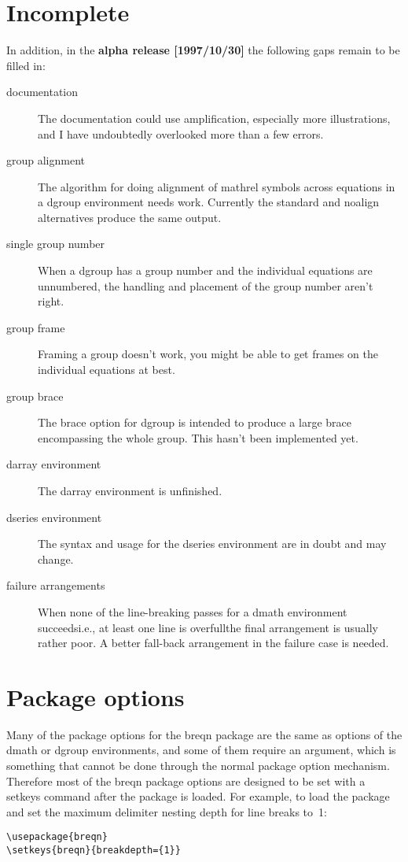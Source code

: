 \documentclass{article}
\newcommand{\ntt}{\normalfont\ttfamily}
\DeclareRobustCommand{\cs}[1]{{\ntt\ttbackslash#1}}
\let\cn=\cs
\DeclareRobustCommand{\pkg}[1]{{\ntt#1}}
\let\opt=\pkg \let\env=\pkg \let\fn=\pkg
\newcommand\dash{\textemdash}
\newcommand\thepkg[1]{the \pkg{breqn} package}
\begin{document}
\section{Incomplete}
In addition, in the \textbf{alpha release [1997/10/30]} the following
gaps remain to be filled in:
\begin{description}
\item[documentation]
The documentation could use amplification, especially more
illustrations, and I have undoubtedly overlooked more than a few errors.

\item[group alignment] The algorithm for doing alignment
of mathrel symbols across equations in a \env{dgroup} environment 
needs work. Currently the standard and \opt{noalign} alternatives
produce the same output.

\item[single group number] When a \env{dgroup} has a group number and
the individual equations are unnumbered, the handling and placement of
the group number aren't right.

\item[group frame] Framing a group doesn't work, you might be able to
get frames on the individual equations at best.

\item[group brace] The \opt{brace} option for \env{dgroup} is intended
to produce a large brace encompassing the whole group. This hasn't been
implemented yet.

\item[darray environment] The \env{darray} environment is unfinished.

\item[dseries environment] The syntax and usage for the \env{dseries}
environment are in doubt and may change.

\item[failure arrangements] When none of the line-breaking passes for a
\env{dmath} environment succeeds\dash i.e., at least one line is
overfull\dash the final arrangement is usually rather poor. A better
fall-back arrangement in the failure case is needed.

\end{description}

\section{Package options}

Many of the package options for \thepkg/ are the same as options of the
\env{dmath} or \env{dgroup} environments, and some of them require an
argument, which is something that cannot be done through the normal
package option mechanism. Therefore most of the \pkg{breqn} package
options are designed to be set with a \cn{setkeys} command after the
package is loaded. For example, to load the package and set the
maximum delimiter nesting depth for line breaks to~1:
\begin{verbatim}
\usepackage{breqn}
\setkeys{breqn}{breakdepth={1}}
\end{verbatim}
\end{document}

